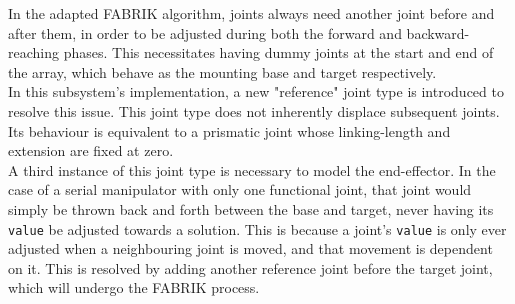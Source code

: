 
In the adapted FABRIK algorithm, joints always need another joint before and after them, in order to be adjusted during both the forward and backward-reaching phases. This necessitates having dummy joints at the start and end of the array, which behave as the mounting base and target respectively.\\
In this subsystem's implementation, a new "reference" joint type is introduced to resolve this issue. This joint type does not inherently displace subsequent joints. Its behaviour is equivalent to a prismatic joint whose linking-length and extension are fixed at zero.\\
A third instance of this joint type is necessary to model the end-effector. In the case of a serial manipulator with only one functional joint, that joint would simply be thrown back and forth between the base and target, never having its \verb|value| be adjusted towards a solution. This is because a joint's \verb|value| is only ever adjusted when a neighbouring joint is moved, and that movement is dependent on it. This is resolved by adding another reference joint before the target joint, which will undergo the FABRIK process.

